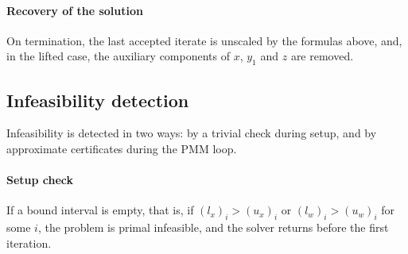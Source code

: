 \paragraph{Recovery of the solution} On termination, the last accepted iterate is unscaled by the formulas above, and, in the lifted case, the auxiliary components of $x$, $y_1$ and $z$ are removed.


\subsection{Infeasibility detection} \label{subsec: infeasibility implementation}

Infeasibility is detected in two ways: by a trivial check during setup, and by approximate certificates during the PMM loop.

\paragraph{Setup check} If a bound interval is empty, that is, if $(l_x)_i > (u_x)_i$ or $(l_w)_i > (u_w)_i$ for some $i$, the problem is primal infeasible, and the solver returns before the first iteration.

